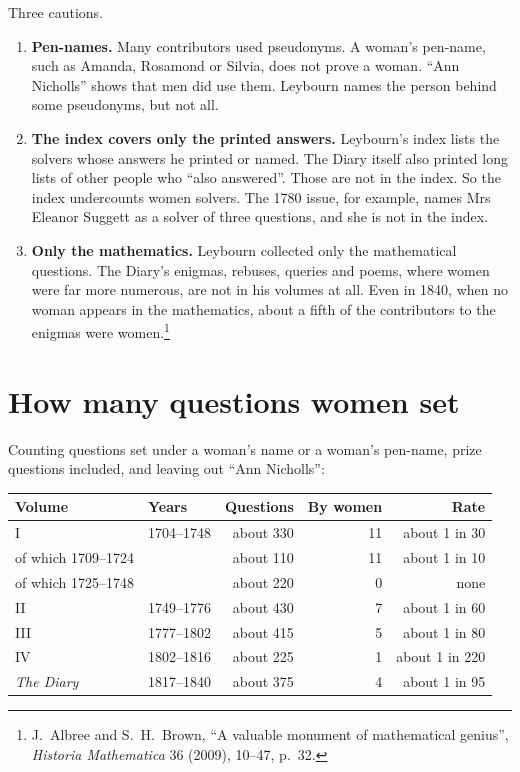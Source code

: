 \documentclass[11pt,a4paper]{article}
\begin{document}
Three cautions.
\begin{enumerate}
\item \textbf{Pen-names.} Many contributors used pseudonyms. A woman's pen-name, such as
Amanda, Rosamond or Silvia, does not prove a woman. ``Ann Nicholls'' shows that men did
use them. Leybourn names the person behind some pseudonyms, but not all.
\item \textbf{The index covers only the printed answers.} Leybourn's index lists the
solvers whose answers he printed or named. The Diary itself also printed long lists of
other people who ``also answered''. Those are not in the index. So the index undercounts
women solvers. The 1780 issue, for example, names Mrs Eleanor Suggett as a solver of
three questions, and she is not in the index.
\item \textbf{Only the mathematics.} Leybourn collected only the mathematical questions.
The Diary's enigmas, rebuses, queries and poems, where women were far more numerous,
are not in his volumes at all. Even in 1840, when no woman appears in the mathematics,
about a fifth of the contributors to the enigmas were women.\footnote{J.~Albree and S.~H.~Brown, ``A valuable monument of mathematical genius'', \textit{Historia Mathematica} 36 (2009), 10--47, p.~32.}
\end{enumerate}

\section*{How many questions women set}

Counting questions set under a woman's name or a woman's pen-name, prize questions
included, and leaving out ``Ann Nicholls'':

\begin{center}
\begin{tabular}{l l r r r}
\toprule
Volume & Years & Questions & By women & Rate\\
\midrule
I   & 1704--1748 & about 330 & 11 & about 1 in 30\\
\quad of which 1709--1724 & & about 110 & 11 & about 1 in 10\\
\quad of which 1725--1748 & & about 220 & 0 & none\\
II  & 1749--1776 & about 430 & 7  & about 1 in 60\\
III & 1777--1802 & about 415 & 5  & about 1 in 80\\
IV  & 1802--1816 & about 225 & 1  & about 1 in 220\\
\textit{The Diary} & 1817--1840 & about 375 & 4  & about 1 in 95\\
\bottomrule
\end{tabular}
\end{center}
\end{document}
